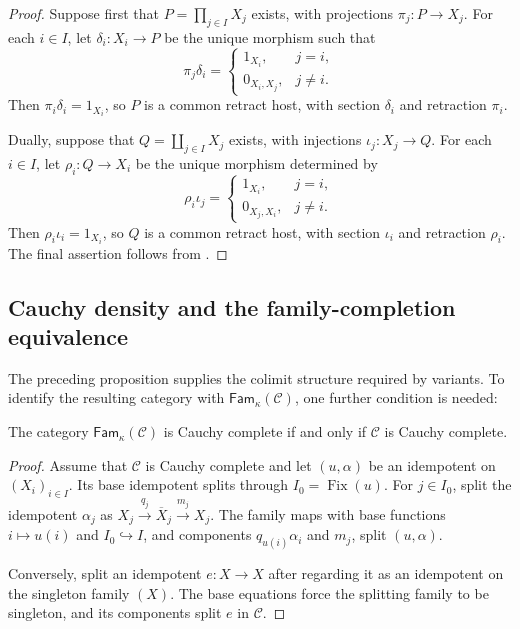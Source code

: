 \documentclass[runningheads,envcountsame]{llncs}
\newcommand{\Fam}{\mathsf{Fam}}
\newcommand{\Fix}{\operatorname{Fix}}
\begin{document}
\begin{proof}
Suppose first that $P=\prod_{j\in I}X_j$ exists, with projections
$\pi_j:P\to X_j$. For each $i\in I$, let
$\delta_i:X_i\to P$ be the unique morphism such that
$$
\pi_j\delta_i=
\begin{cases}
1_{X_i},&j=i,\\
0_{X_i,X_j},&j\neq i.
\end{cases}
$$
Then $\pi_i\delta_i=1_{X_i}$, so $P$ is a common retract host, with
section $\delta_i$ and retraction $\pi_i$.

Dually, suppose that $Q=\coprod_{j\in I}X_j$ exists, with injections
$\iota_j:X_j\to Q$. For each $i\in I$, let $\rho_i:Q\to X_i$ be
the unique morphism determined by
$$
\rho_i\iota_j=
\begin{cases}
1_{X_i},&j=i,\\
0_{X_j,X_i},&j\neq i.
\end{cases}
$$
Then $\rho_i\iota_i=1_{X_i}$, so $Q$ is a common retract host, with
section $\iota_i$ and retraction $\rho_i$. The final assertion follows
from .
\end{proof}













\subsection{Cauchy density and the family-completion equivalence}

The preceding proposition supplies the colimit structure required by variants. To identify the resulting category with $\Fam_\kappa(\mathcal C)$, one further condition is needed: 

\begin{lemma}
\label{lem:fam-cauchy}
The category $\Fam_\kappa(\mathcal C)$ is Cauchy complete if and only if
$\mathcal C$ is Cauchy complete.
\end{lemma}

\begin{proof}
Assume that $\mathcal C$ is Cauchy complete and let $(u,\alpha)$ be an
idempotent on $(X_i)_{i\in I}$. Its base idempotent splits through
$I_0=\Fix(u)$. For $j\in I_0$, split the idempotent $\alpha_j$ as
$X_j\xrightarrow{q_j}\overline X_j\xrightarrow{m_j}X_j$. The family maps
with base functions $i\mapsto u(i)$ and $I_0\hookrightarrow I$, and components
$q_{u(i)}\alpha_i$ and $m_j$, split $(u,\alpha)$.

Conversely, split an idempotent $e:X\to X$ after regarding it as an
idempotent on the singleton family $(X)$. The base equations force the
splitting family to be singleton, and its components split $e$ in
$\mathcal C$.
\end{proof}
\end{document}
